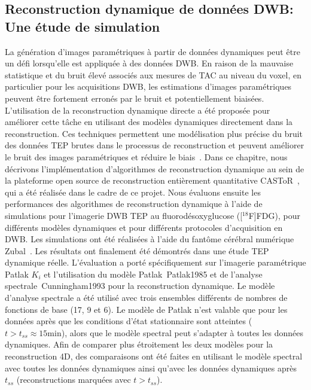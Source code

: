 \documentclass[a4paper]{article}
\begin{document}
\subsection*{Reconstruction dynamique de données DWB: Une étude de simulation}
La génération d'images paramétriques à partir de données dynamiques peut être un défi lorsqu'elle est appliquée à des données DWB.
En raison de la mauvaise statistique et du bruit élevé associés aux mesures de TAC au niveau du voxel, en particulier pour les acquisitions DWB, les estimations d'images paramétriques peuvent être fortement erronés par le bruit et potentiellement biaisées. 
L'utilisation de la reconstruction dynamique directe a été proposée pour améliorer cette tâche en utilisant des modèles dynamiques directement dans la reconstruction. Ces techniques permettent une modélisation plus précise du bruit des données TEP brutes dans le processus de reconstruction et peuvent améliorer le bruit des images paramétriques et réduire le biais~\cite{Reader2014}. 
Dans ce chapitre, nous décrivons l'implémentation d'algorithmes de reconstruction dynamique au sein de la plateforme open source de reconstruction entièrement quantitative CASToR~\cite{Merlin2018}, qui a été réalisée dans le cadre de ce projet. Nous évaluons ensuite les performances des algorithmes de reconstruction dynamique à l'aide de simulations pour l'imagerie DWB TEP au fluorodésoxyglucose ([$^{18}$F]FDG), pour différents modèles dynamiques et pour différents protocoles d'acquisition en DWB. Les simulations ont été réalisées à l'aide du fantôme cérébral numérique Zubal~\cite{Zubal1994}. Les résultats ont finalement été démontrés dans une étude TEP dynamique réelle.
L'évaluation a porté spécifiquement sur l'imagerie paramétrique Patlak $K_i$ et l'utilisation du modèle Patlak~{Patlak1985} et de l'analyse spectrale~{Cunningham1993} pour la reconstruction dynamique. Le modèle d'analyse spectrale a été utilisé avec trois ensembles différents de nombres de fonctions de base (17, 9 et 6). Le modèle de Patlak n'est valable que pour les données après que les conditions d'état stationnaire sont atteintes ($t>t_{ss}\approx\mathrm{15 min}$), alors que le modèle spectral peut s'adapter à toutes les données dynamiques. Afin de comparer plus étroitement les deux modèles pour la reconstruction 4D, des comparaisons ont été faites en utilisant le modèle spectral avec toutes les données dynamiques ainsi qu'avec les données dynamiques après $t_{ss}$ (reconstructions marquées avec $t > t_{ss}$).
\end{document}
